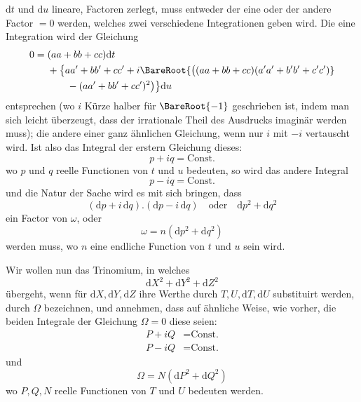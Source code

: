 \(\mathrm{d}t\) und \(\mathrm{d}u\) lineare, Factoren zerlegt, muss entweder der eine oder der andere Factor \(=0\) werden, welches zwei verschiedene Integrationen geben wird. Die eine Integration wird der Gleichung
\[
\begin{aligned}
0={}&(aa+bb+cc)\mathrm{d}t\\
&+\bigl\{aa'+bb'+cc'+i\BareRoot{\bigl((aa+bb+cc)(a'a'+b'b'+c'c')}\\
&\qquad-(aa'+bb'+cc')^2\bigr)\bigr\}\mathrm{d}u
\end{aligned}
\]
\noindent entsprechen (wo \(i\) Kürze halber für \(\BareRoot{-1}\) geschrieben ist, indem man sich leicht überzeugt, dass der irrationale Theil des Ausdrucks imaginär werden muss); die andere einer ganz ähnlichen Gleichung, wenn nur \(i\) mit \(-i\) vertauscht wird. Ist also das Integral der erstern Gleichung dieses:
\[
p+iq=\text{Const.}
\]
\noindent wo \(p\) und \(q\) reelle Functionen von \(t\) und \(u\) bedeuten, so wird das andere Integral
\[
p-iq=\text{Const.}
\]
\noindent und die Natur der Sache wird es mit sich bringen, dass
\[
(\mathrm{d}p+i\,\mathrm{d}q)\mathord{.}(\mathrm{d}p-i\,\mathrm{d}q)\quad\text{oder}\quad\mathrm{d}p^2+\mathrm{d}q^2
\]
\noindent ein Factor von \(\omega\), oder
\[
\omega=n(\mathrm{d}p^2+\mathrm{d}q^2)
\]
\noindent werden muss, wo \(n\) eine endliche Function von \(t\) und \(u\) sein wird.

Wir wollen nun das Trinomium, in welches
\[
\mathrm{d}X^2+\mathrm{d}Y^2+\mathrm{d}Z^2
\]
\noindent übergeht, wenn für \(\mathrm{d}X,\mathrm{d}Y,\mathrm{d}Z\) ihre Werthe durch \(T,U,\mathrm{d}T,\mathrm{d}U\) substituirt werden, durch \(\Omega\) bezeichnen, und annehmen, dass auf ähnliche Weise, wie vorher, die beiden Integrale der Gleichung \(\Omega=0\) diese seien:
\[
\begin{aligned}
P+iQ&=\text{Const.}\\
P-iQ&=\text{Const.}
\end{aligned}
\]
\noindent und
\[
\Omega=N(\mathrm{d}P^2+\mathrm{d}Q^2)
\]
\noindent wo \(P,Q,N\) reelle Functionen von \(T\) und \(U\) bedeuten werden.
